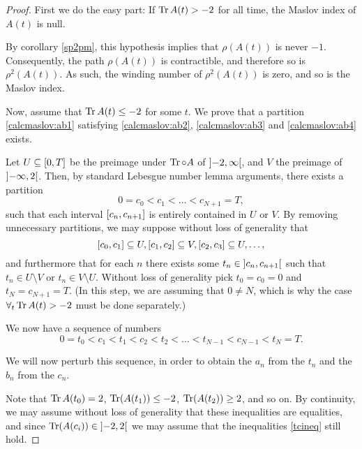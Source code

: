 \begin{proof}
First we do the easy part: If $\operatorname{Tr} A(t) > -2$ for all time, the Maslov index of $A(t)$ is null.

By corollary \ref{sp2pm}, this hypothesis implies that $\rho(A(t))$ is never $-1$. Consequently, the path $\rho(A(t))$ is contractible, and therefore so is $\rho^2(A(t))$. As such, the winding number of $\rho^2(A(t))$ is zero, and so is the Maslov index.

Now, assume that $\operatorname{Tr} A(t) \leq -2$ for some $t$. We prove that a partition \eqref{calcmaslov:ab1} satisfying \ref{calcmaslov:ab2}, \ref{calcmaslov:ab3} and \ref{calcmaslov:ab4} exists.

Let $U \subseteq \interval 0 T$ be the preimage under $\operatorname{Tr} \circ A$ of $\ointerval{-2}\infty$, and $V$ the preimage of $\ointerval{-\infty}2$. Then, by standard Lebesgue number lemma arguments, there exists a partition 
\begin{equation}
0 = c_0 < c_1 < \dots < c_{N+1} = T,
\end{equation}
such that each interval $\interval{c_n}{c_{n+1}}$ is entirely contained in $U$ or $V$. By removing unnecessary partitions, we may suppose without loss of generality that
\begin{equation}
\interval{c_0}{c_1} \subseteq U, \interval{c_1}{c_2} \subseteq V, \interval{c_2}{c_3} \subseteq U, \dots,
\end{equation}
and furthermore that for each $n$ there exists some $t_n \in \ointerval{c_n}{c_{n+1}}$ such that $t_n \in U \setminus V$ or $t_n \in V \setminus U$. Without loss of generality pick $t_0 = c_0 = 0$ and $t_N = c_{N+1} = T$. (In this step, we are assuming that $0 \neq N$, which is why the case $\forall_t \operatorname{Tr} A(t) > -2$ must be done separately.)

We now have a sequence of numbers
\begin{equation}\label{tcineq}
0 = t_0 < c_1 < t_1 < c_2 < t_2 < \dots < t_{N-1} < c_{N-1} < t_{N} = T.
\end{equation}

We will now perturb this sequence, in order to obtain the $a_n$ from the $t_n$ and the $b_n$ from the $c_n$.

Note that $\operatorname{Tr} A(t_0) = 2$, $\operatorname{Tr}(A(t_1)) \leq -2$, $\operatorname{Tr}(A(t_2)) \geq 2$, and so on. By continuity, we may assume without loss of generality that these inequalities are equalities, and since $\trace(A(c_i)) \in \ointerval{-2}2$ we may assume that the inequalities \eqref{tcineq} still hold.


\end{proof}
